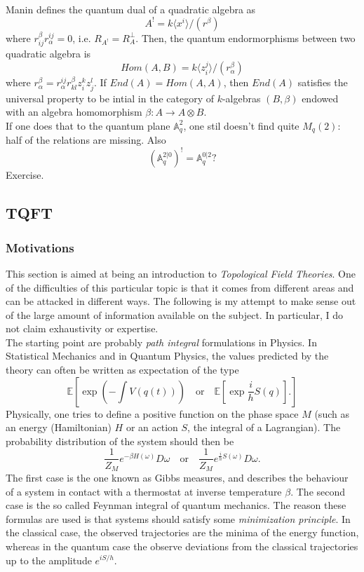 Manin defines the quantum dual of a quadratic algebra as
\[A^{!} = k\langle x^i\rangle / (r^\beta)\]
where $r^\beta_{ij}r^{ij}_\alpha = 0$, i.e. $R_{A^!}=R_{A}^\perp$. Then, the quantum endormorphisms between two quadratic algebra is
\[Hom(A,B) =k\langle z^j_i\rangle / (r_\alpha^\beta)\]
where $r_\alpha^\beta = r_\alpha^{ij}r^\beta_{kl} z_i^k z_j^l$. If $End(A)= Hom(A,A)$, then $End(A)$ satisfies the universal property to be intial in the category of $k$-algebras $(B,\beta)$ endowed with an algebra homomorphism $\beta: A \rightarrow A\otimes B$.\\ 

If one does that to the quantum plane $\mathbb A_q^2$, one stil doesn't find quite $M_q(2)$: half of the relations are missing. Also 
\[(\mathbb A_q^{2|0})^! = \mathbb A_q^{0|2}?\] Exercise.

\subsection{TQFT}

\subsubsection{Motivations}

This section is aimed at being an introduction to \textit{Topological Field Theories}. One of the difficulties of this particular topic is that it comes from different areas and can be attacked in different ways. The following is my attempt to make sense out of the large amount of information available on the subject. In particular, I do not claim exhaustivity or expertise.\\

The starting point are probably \textit{path integral} formulations in Physics. In Statistical Mechanics and in Quantum Physics, the values predicted by the theory can often be written as expectation of the type
\[\mathbb E[\exp (-\int V(q(t))) \quad \text{or} \quad \mathbb E [\exp \frac{i}{h} S(q)] .]\]
Physically, one tries to define a positive function on the phase space $M$ (such as an energy (Hamiltonian) $H$ or an action $S$, the integral of a Lagrangian). The probability distribution of the system should then be
\[\frac{1}{Z_M}e^{-\beta H(\omega)} D\omega \quad \text{or}\quad \frac{1}{Z_M}e^{\frac{i}{h}S(\omega)} D\omega .\]
The first case is the one known as Gibbs measures, and describes the behaviour of a system in contact with a thermostat at inverse temperature $\beta$. The second case is the so called Feynman integral of quantum mechanics. The reason these formulas are used is that systems should satisfy some \textit{minimization principle}. In the classical case, the observed trajectories are the minima of the energy function, whereas in the quantum case the observe deviations from the classical trajectories up to the amplitude $e^{iS/h}$.\\ 

